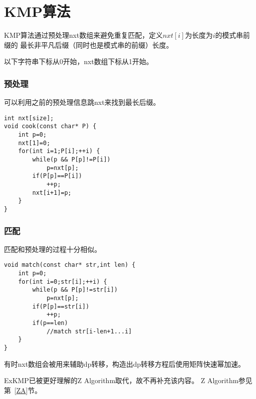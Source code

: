 \section{KMP算法}

KMP算法通过预处理nxt数组来避免重复匹配，定义$nxt[i]$为长度为$i$的模式串前缀的
最长非平凡后缀（同时也是模式串的前缀）长度。

以下字符串下标从0开始，nxt数组下标从1开始。
\subsubsection{预处理}
可以利用之前的预处理信息跳nxt来找到最长后缀。
\begin{lstlisting}
int nxt[size];
void cook(const char* P) {
    int p=0;
    nxt[1]=0;
    for(int i=1;P[i];++i) {
        while(p && P[p]!=P[i])
            p=nxt[p];
        if(P[p]==P[i])
            ++p;
        nxt[i+1]=p;
    }
}
\end{lstlisting}
\subsubsection{匹配}
匹配和预处理的过程十分相似。
\begin{lstlisting}
void match(const char* str,int len) {
    int p=0;
    for(int i=0;str[i];++i) {
        while(p && P[p]!=str[i])
            p=nxt[p];
        if(P[p]==str[i])
            ++p;
        if(p==len)
            //match str[i-len+1...i]
    }
}
\end{lstlisting}

有时nxt数组会被用来辅助dp转移，构造出dp转移方程后使用矩阵快速幂加速。

ExKMP已被更好理解的Z Algorithm取代，故不再补充该内容。
Z Algorithm参见第~\ref{ZA}节。
